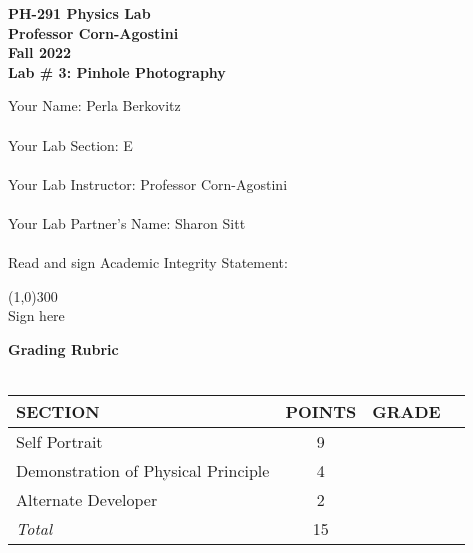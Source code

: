 

\begin{titlepage}

        \begin{center}
        \textbf{\huge PH-291 Physics Lab} \\ 
        \textbf{\Large Professor Corn-Agostini} \\ 
        \textbf{\Large Fall 2022} \\ 
        \vspace*{.5cm}  
        \textbf{\large Lab \# 3: Pinhole Photography}
        \vspace{0.5cm}
        \end{center}
       
\noindent Your Name: Perla Berkovitz\\ \\
\noindent Your Lab Section: E\\ \\
\noindent Your Lab Instructor: Professor Corn-Agostini\\ \\
\noindent Your Lab Partner's Name: Sharon Sitt\\ \\
\noindent Read and sign Academic Integrity Statement:\\


    \begin{center}
    \line(1,0){300} \\
    Sign here
    \end{center}

\noindent\textbf{\large Grading Rubric} \\ \\
\renewcommand{\arraystretch}{1.5}
\begin{tabular}{|l|c|r|l|} \hline
 {\bf SECTION } & {\bf POINTS} & {\bf GRADE}\\\hline 
Self Portrait & 9 & \\\hline
Demonstration of Physical Principle & 4 & \\\hline
Alternate Developer & 2 & \\\hline \hline 
{\em Total} & 15 & \\ \hline
\end{tabular}

\end{titlepage} 



